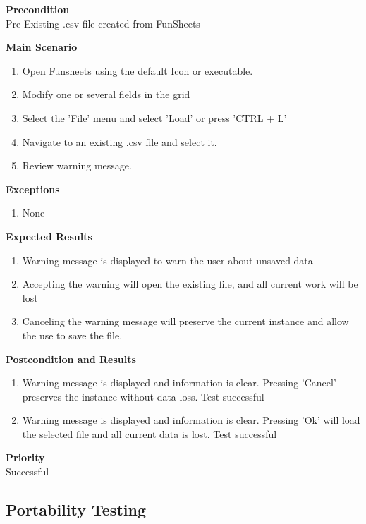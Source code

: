 \documentclass[12pt]{article}
\begin{document}
\noindent
{\bf Precondition}\\
Pre-Existing .csv file created from FunSheets

\noindent
{\bf Main Scenario}\\
\vspace*{-0.2in}
\begin{enumerate}
\item Open Funsheets using the default Icon or executable.
\item Modify one or several fields in the grid
\item Select the 'File' menu and select 'Load' or press 'CTRL + L'
\item Navigate to an existing .csv file and select it.
\item Review warning message.
\end{enumerate}

{\bf Exceptions}\
\begin{enumerate}
\item None
\end{enumerate}

{\bf Expected Results}\
\begin{enumerate}
\item Warning message is displayed to warn the user about unsaved data
\item Accepting the warning will open the existing file, and all current work will be lost
\item Canceling the warning message will preserve the current instance and allow the use to save the file.
\end{enumerate}

\noindent
{\bf Postcondition and Results}\
\begin{enumerate}
\item Warning message is displayed and information is clear. Pressing 'Cancel' preserves the instance without data loss. Test successful
\item Warning message is displayed and information is clear. Pressing 'Ok' will load the selected file and all current data is lost. Test successful
\end{enumerate}

\noindent
{\bf Priority}\\
Successful
\noindent

\subsection{Portability Testing}
\end{document}
